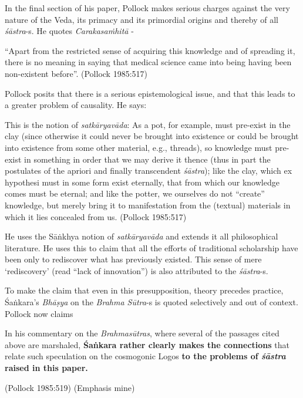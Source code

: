 In the final section of his paper, Pollock makes serious charges against the very nature of the Veda, its primacy and its primordial origins and thereby of all {\sl śāstra}-s. He quotes {\sl Carakasaṁhitā} - 
\begin{myquote}
``Apart from the restricted sense of acquiring this knowledge and of spreading it, there is no meaning in saying that medical science came into being having been non-existent before''. (Pollock 1985:517)

Pollock posits that there is a serious  epistemological issue, and that this leads to a greater problem of causality. He says:

This is the notion of {\sl satkāryavāda}: As a pot, for example, must pre-exist in the clay (since otherwise it could never be brought into existence or could be brought into existence from some other material, e.g., threads), so knowledge must pre-exist in something in order that we may derive it thence (thus in part the postulates of the apriori and finally transcendent {\sl śāstra}); like the clay, which ex hypothesi must in some form exist eternally, that from which our knowledge comes must be eternal; and like the potter, we ourselves do not ``create'' knowledge, but merely bring it to manifestation from the (textual) materials in which it lies concealed from us. 
\hfill	(Pollock 1985:517)
\end{myquote}

He uses the Sāṅkhya notion of {\sl satkāryavāda}  and extends it all philosophical literature. He uses this to claim that all the efforts of traditional scholarship have been only to rediscover what has previously existed. This sense of mere `rediscovery' (read ``lack of innovation'') is also attributed to the {\sl śāstra}-s.

To make the claim that even in this presupposition, theory precedes practice, Śaṅkara's {\sl Bhāṣya} on the {\sl Brahma Sūtra}-s is quoted selectively and out of context. Pollock now claims 
\begin{myquote}
In his commentary on the {\sl Brahmasūtras}, where several of the passages cited above are marshaled, {\bf Śaṅkara rather clearly makes the connections} that relate such speculation on the cosmogonic Logos {\bf to the problems of {{\sl\bfseries śāstra}\relax} raised in this paper.}

\hfill	(Pollock 1985:519) (Emphasis mine)
\end{myquote}

